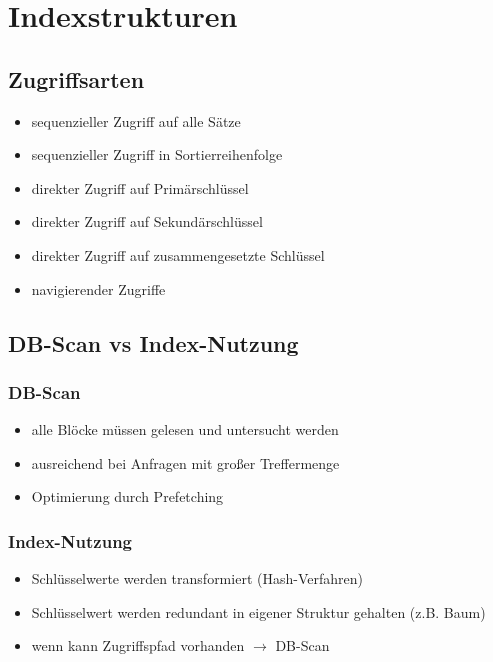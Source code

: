 \documentclass[a4paper]{article}
\begin{document}
\section{Indexstrukturen}

\subsection{Zugriffsarten}
\begin{itemize}
    \item sequenzieller Zugriff auf alle Sätze
    \item sequenzieller Zugriff in Sortierreihenfolge
    \item direkter Zugriff auf Primärschlüssel
    \item direkter Zugriff auf Sekundärschlüssel
    \item direkter Zugriff auf zusammengesetzte Schlüssel
    \item navigierender Zugriffe
\end{itemize}

\subsection{DB-Scan vs Index-Nutzung}

    \subsubsection{DB-Scan}
    \begin{itemize}
        \item alle Blöcke müssen gelesen und untersucht werden
        \item ausreichend bei Anfragen mit großer Treffermenge
        \item Optimierung durch Prefetching
    \end{itemize}
    
    \subsubsection{Index-Nutzung}
    \begin{itemize}
        \item Schlüsselwerte werden transformiert (Hash-Verfahren)
        \item Schlüsselwert werden redundant in eigener Struktur gehalten (z.B. Baum)
        \item wenn kann Zugriffspfad vorhanden $\to$ DB-Scan
    \end{itemize}
\end{document}
